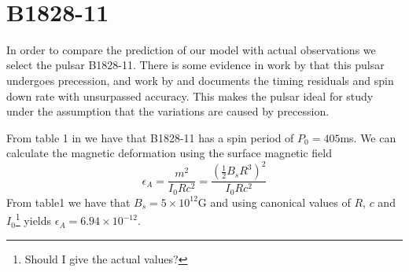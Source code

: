 \documentclass[11pt]{article}
\numberwithin{equation}{section}
\numberwithin{figure}{section}
\numberwithin{table}{section}
\begin{document}
\begin{figure}[ht]
\centering
	 \\
\caption{}
\label{fig:nu_dot no torque}
\end{figure}



\FloatBarrier
\section{B1828-11}
In order to compare the prediction of our model with actual observations we select the pulsar B1828-11. There is some evidence in work by \cite{Lyne2000} that this pulsar undergoes precession,  and work by \cite{Hobbs2010} and \cite{Lyne2010} documents the timing residuals and spin down rate with unsurpassed accuracy. This makes the pulsar ideal for study under the assumption that the variations are caused by precession.

From table 1 in \citet{Lyne2000} we have that B1828-11 has  a spin period of $P_{0}=405$ms. We can calculate the magnetic deformation using the surface magnetic field 
\begin{equation}
\epsilon_{A}=\frac{m^{2}}{I_{0}Rc^{2}}=\frac{(\frac{1}{2}B_{s}R^{3})^{2}}{I_{0}Rc^{2}}
\end{equation}
From table1 we have that $B_{s}=5\times10^{12}$G and using canonical values of $R$, $c$ and $I_{0}$\footnote{Should I give the actual values?} yields $\epsilon_{A}=6.94\times10^{-12}$.
\end{document}

